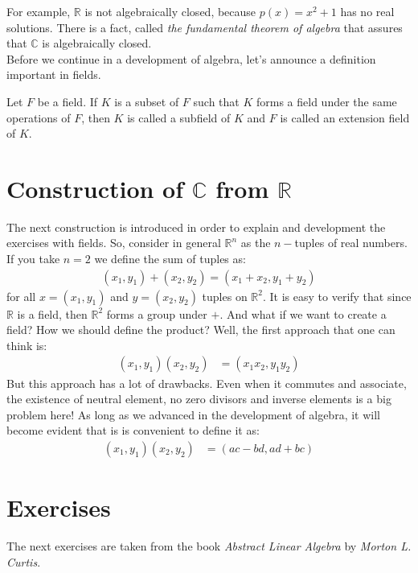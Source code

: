 \documentclass{tufte-handout}
\begin{document}
For example, $\mathbb{R}$ is not algebraically closed, because $p(x) = x^2+1$ has no real solutions. There is a fact, called \textit{the fundamental theorem of algebra} that assures that $\mathbb{C}$ is algebraically closed.\\

Before we continue in a development of algebra, let's announce a definition important in fields.

\begin{definition}[Subfield]
	Let $F$ be a field. If $K$ is a subset of $F$ such that $K$ forms a field under the same operations of $F$, then $K$ is called a subfield of $K$ and $F$ is called an extension field of $K$.
\end{definition}


\section{Construction of $\mathbb{C}$ from $\mathbb{R}$}
The next construction is introduced in order to explain and development the exercises with fields. So, consider in general $\mathbb{R}^n$ as the $n-$tuples of real numbers. If you take $n =2$ we define the sum of tuples as:
\begin{align*}
	(x_1, y_1) + (x_2, y_2) = (x_1 + x_2, y_1 + y_2)
\end{align*}
for all $x = (x_1, y_1)$ and $y = (x_2, y_2)$ tuples on $\mathbb{R}^2$. It is easy to verify that since $\mathbb{R}$ is a field, then $\mathbb{R}^2$ forms a group under $+$. And what if we want to create a field? How we should define the product? Well, the first approach that one can think is:
\begin{align*}
	(x_1, y_1)(x_2, y_2) &= (x_1x_2, y_1y_2)
\end{align*}
But this approach has a lot of drawbacks. Even when it commutes and associate, the existence of neutral element, no zero divisors and inverse elements is a big problem here! As long as we advanced in the development of algebra, it will become evident that is is convenient to define it as:
\begin{align*}
	(x_1, y_1)(x_2, y_2) &= (ac-bd, ad+bc)
\end{align*}

\section{Exercises}
The next exercises are taken from the book \textit{Abstract Linear Algebra} by \textit{Morton L. Curtis}.
\end{document}
